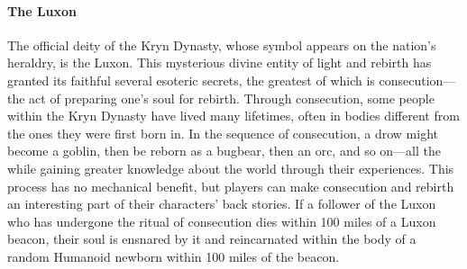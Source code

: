 \documentclass[10pt,a4paper,twoside,bg=print,twocolumn,openany,nodeprecatedcode]{dndbook}
\begin{document}
\paragraph{The Luxon}
The official deity of the Kryn Dynasty, whose symbol appears on the nation's heraldry, is the Luxon. This mysterious divine entity of light and rebirth has granted its faithful several esoteric secrets, the greatest of which is consecution—the act of preparing one's soul for rebirth. Through consecution, some people within the Kryn Dynasty have lived many lifetimes, often in bodies different from the ones they were first born in. In the sequence of consecution, a drow might become a goblin, then be reborn as a bugbear, then an orc, and so on—all the while gaining greater knowledge about the world through their experiences. This process has no mechanical benefit, but players can make consecution and rebirth an interesting part of their characters' back stories.
If a follower of the Luxon who has undergone the ritual of consecution dies within 100 miles of a Luxon beacon, their soul is ensnared by it and reincarnated within the body of a random Humanoid newborn within 100 miles of the beacon.
\end{document}
